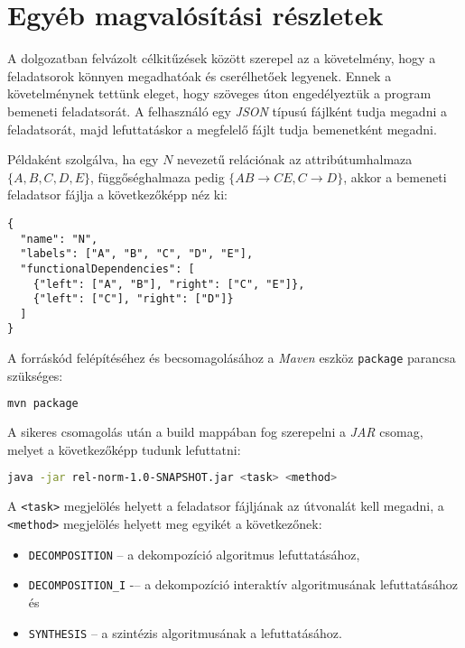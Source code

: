 \section{Egyéb magvalósítási részletek}

A dolgozatban felvázolt célkitűzések között szerepel az a követelmény, hogy a feladatsorok könnyen megadhatóak és cserélhetőek legyenek. Ennek a követelménynek tettünk eleget, hogy szöveges úton engedélyeztük a program bemeneti feladatsorát. A felhasználó egy \textit{JSON} típusú fájlként tudja megadni a feladatsorát, majd lefuttatáskor a megfelelő fájlt tudja bemenetként megadni.

Példaként szolgálva, ha egy $N$ nevezetű relációnak az attribútumhalmaza $\{A,B,C,D,E\}$, függőséghalmaza pedig $\{AB \to CE, C \to D\}$, akkor a bemeneti feladatsor fájlja a következőképp néz ki:

\linespread{1}
\begin{lstlisting}
{
  "name": "N",
  "labels": ["A", "B", "C", "D", "E"],
  "functionalDependencies": [
    {"left": ["A", "B"], "right": ["C", "E"]},
    {"left": ["C"], "right": ["D"]}
  ]
}
\end{lstlisting}

A forráskód felépítéséhez és becsomagolásához a \textit{Maven} eszköz \lstinline{package} parancsa szükséges:

\linespread{1}
\begin{lstlisting}[language=sh]
mvn package
\end{lstlisting}

A sikeres csomagolás után a build mappában fog szerepelni a \textit{JAR} csomag, melyet a következőképp tudunk lefuttatni:

\linespread{1}
\begin{lstlisting}[language=sh]
java -jar rel-norm-1.0-SNAPSHOT.jar <task> <method>
\end{lstlisting}

A \lstinline{<task>} megjelölés helyett a feladatsor fájljának az útvonalát kell megadni, a \lstinline{<method>} megjelölés helyett meg egyikét a következőnek:

\begin{itemize}
    \item \lstinline{DECOMPOSITION} -- a dekompozíció algoritmus lefuttatásához,
	\item \lstinline{DECOMPOSITION_I} -– a dekompozíció interaktív algoritmusának lefuttatásához és
	\item \lstinline{SYNTHESIS} -- a szintézis algoritmusának a lefuttatásához.
\end{itemize}
	
